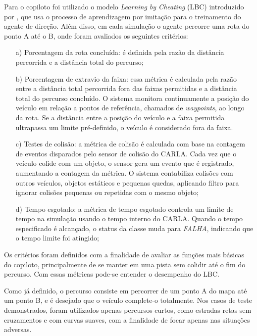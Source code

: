 \documentclass[a4paper,12pt,Times]{article}
\begin{document}
Para o copiloto foi utilizado o modelo \textit{Learning by Cheating} (LBC) introduzido por , que usa o processo de aprendizagem por imitação para o treinamento do agente de direção. Além disso, em cada simulação o agente percorre uma rota do ponto A até o B, onde foram avaliados os seguintes critérios:
\begin{enumerate}
    \item[a)] Porcentagem da rota concluída: é definida pela razão da distância percorrida e a distância total do percurso; 
    
    \item[b)] Porcentagem de extravio da faixa: essa métrica é calculada pela razão entre a distância total percorrida fora das faixas permitidas e a distância total do percurso concluído. O sistema monitora continuamente a posição do veículo em relação a pontos de referência, chamados de \textit{waypoints}, ao longo da rota. Se a distância entre a posição do veículo e a faixa permitida ultrapassa um limite pré-definido, o veículo é considerado fora da faixa. 
    
    \item[c)] Testes de colisão: a métrica de colisão é calculada com base na contagem de eventos disparados pelo sensor de colisão do CARLA. Cada vez que o veículo colide com um objeto, o sensor gera um evento que é registrado, aumentando a contagem da métrica. O sistema contabiliza colisões com outros veículos, objetos estáticos e pequenas quedas, aplicando filtro para ignorar colisões pequenas ou repetidas com o mesmo objeto;
    
    \item[d)] Tempo esgotado: a métrica de  tempo esgotado controla um limite de tempo na simulação usando o tempo interno do CARLA. Quando o tempo especificado é alcançado, o status da classe muda para \textit{FALHA}, indicando que o tempo limite foi atingido;

\end{enumerate}

Os critérios foram definidos com a finalidade de avaliar as funções mais básicas do copiloto, principalmente de se manter em uma pista sem colidir até o fim do percurso. Com essas métricas pode-se entender o desempenho do LBC.

Como já definido, o percurso consiste em percorrer de um ponto A do mapa até um ponto B, e é desejado que o veículo complete-o totalmente. Nos casos de teste demonstrados, foram utilizados apenas percursos curtos, como estradas retas sem cruzamentos e com curvas suaves, com a finalidade de focar apenas nas situações adversas.
\end{document}
